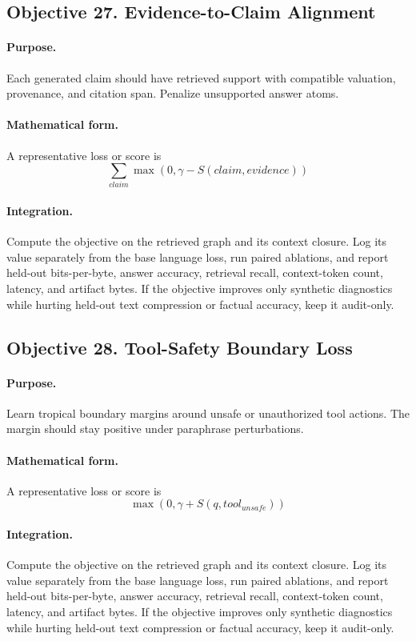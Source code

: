 \documentclass[11pt]{article}
\theoremstyle{definition}
\theoremstyle{remark}
\begin{document}
\subsection{Objective 27. Evidence-to-Claim Alignment}
\paragraph{Purpose.} Each generated claim should have retrieved support with compatible valuation, provenance, and citation span. Penalize unsupported answer atoms.

\paragraph{Mathematical form.} A representative loss or score is
\[
    \sum_{claim}\max(0,\gamma-S(claim,evidence))
\]

\paragraph{Integration.} Compute the objective on the retrieved graph and its context closure. Log its value separately from the base language loss, run paired ablations, and report held-out bits-per-byte, answer accuracy, retrieval recall, context-token count, latency, and artifact bytes. If the objective improves only synthetic diagnostics while hurting held-out text compression or factual accuracy, keep it audit-only.


\subsection{Objective 28. Tool-Safety Boundary Loss}
\paragraph{Purpose.} Learn tropical boundary margins around unsafe or unauthorized tool actions. The margin should stay positive under paraphrase perturbations.

\paragraph{Mathematical form.} A representative loss or score is
\[
    \max(0,\gamma+S(q,tool_{unsafe}))
\]

\paragraph{Integration.} Compute the objective on the retrieved graph and its context closure. Log its value separately from the base language loss, run paired ablations, and report held-out bits-per-byte, answer accuracy, retrieval recall, context-token count, latency, and artifact bytes. If the objective improves only synthetic diagnostics while hurting held-out text compression or factual accuracy, keep it audit-only.
\end{document}
